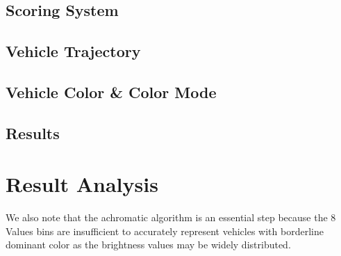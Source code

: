 \subsection{Scoring System}
\subsection{Vehicle Trajectory}
\subsection{Vehicle Color \& Color Mode}
\subsection{Results}

\section{Result Analysis}
We also note that the achromatic algorithm is an essential step because the 8 Values bins are insufficient to accurately represent vehicles with borderline dominant color as the brightness values may be widely distributed.





